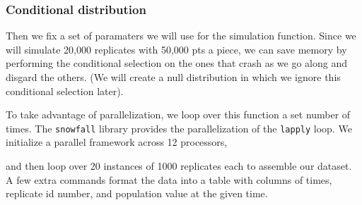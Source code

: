 \subsubsection{Conditional distribution}

Then we fix a set of paramaters we will use for the simulation function.
Since we will simulate 20,000 replicates with 50,000 pts a piece, we can
save memory by performing the conditional selection on the ones that
crash as we go along and disgard the others. (We will create a null
distribution in which we ignore this conditional selection later).

\begin{Shaded}
\begin{Highlighting}[]
    \NormalTok{(} \NormalTok{, } \NormalTok{, } \NormalTok{, } \NormalTok{, } \NormalTok{,}
     \NormalTok{, } \NormalTok{, } \NormalTok{, } \NormalTok{)}
    \NormalTok{(}\NormalTok{)}
    \NormalTok{(sn$x1[d[}\NormalTok{],]==}\NormalTok{)}
\NormalTok{\}}
\end{Highlighting}
\end{Shaded}
To take advantage of parallelization, we loop over this function a set
number of times. The \texttt{snowfall} library provides the
parallelization of the \texttt{lapply} loop. We initialize a parallel
framework across 12 processors,

\begin{Shaded}
\begin{Highlighting}[]
\NormalTok{(}\NormalTok{, }\NormalTok{)}
\NormalTok{()}
\end{Highlighting}
\end{Shaded}
and then loop over 20 instances of 1000 replicates each to assemble our
dataset. A few extra commands format the data into a table with columns
of times, replicate id number, and population value at the given time.

